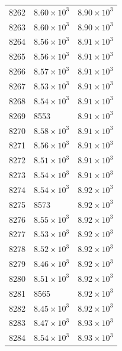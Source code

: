 \begin{table}[H]
\begin{tabular}{lll}
8262 & $\displaystyle 8.60 \times 10^{3}$ & $\displaystyle 8.90 \times 10^{3}$ \\
8263 & $\displaystyle 8.60 \times 10^{3}$ & $\displaystyle 8.90 \times 10^{3}$ \\
8264 & $\displaystyle 8.56 \times 10^{3}$ & $\displaystyle 8.91 \times 10^{3}$ \\
8265 & $\displaystyle 8.56 \times 10^{3}$ & $\displaystyle 8.91 \times 10^{3}$ \\
8266 & $\displaystyle 8.57 \times 10^{3}$ & $\displaystyle 8.91 \times 10^{3}$ \\
8267 & $\displaystyle 8.53 \times 10^{3}$ & $\displaystyle 8.91 \times 10^{3}$ \\
8268 & $\displaystyle 8.54 \times 10^{3}$ & $\displaystyle 8.91 \times 10^{3}$ \\
8269 & 8553 & $\displaystyle 8.91 \times 10^{3}$ \\
8270 & $\displaystyle 8.58 \times 10^{3}$ & $\displaystyle 8.91 \times 10^{3}$ \\
8271 & $\displaystyle 8.56 \times 10^{3}$ & $\displaystyle 8.91 \times 10^{3}$ \\
8272 & $\displaystyle 8.51 \times 10^{3}$ & $\displaystyle 8.91 \times 10^{3}$ \\
8273 & $\displaystyle 8.54 \times 10^{3}$ & $\displaystyle 8.91 \times 10^{3}$ \\
8274 & $\displaystyle 8.54 \times 10^{3}$ & $\displaystyle 8.92 \times 10^{3}$ \\
8275 & 8573 & $\displaystyle 8.92 \times 10^{3}$ \\
8276 & $\displaystyle 8.55 \times 10^{3}$ & $\displaystyle 8.92 \times 10^{3}$ \\
8277 & $\displaystyle 8.53 \times 10^{3}$ & $\displaystyle 8.92 \times 10^{3}$ \\
8278 & $\displaystyle 8.52 \times 10^{3}$ & $\displaystyle 8.92 \times 10^{3}$ \\
8279 & $\displaystyle 8.46 \times 10^{3}$ & $\displaystyle 8.92 \times 10^{3}$ \\
8280 & $\displaystyle 8.51 \times 10^{3}$ & $\displaystyle 8.92 \times 10^{3}$ \\
8281 & 8565 & $\displaystyle 8.92 \times 10^{3}$ \\
8282 & $\displaystyle 8.45 \times 10^{3}$ & $\displaystyle 8.92 \times 10^{3}$ \\
8283 & $\displaystyle 8.47 \times 10^{3}$ & $\displaystyle 8.93 \times 10^{3}$ \\
8284 & $\displaystyle 8.54 \times 10^{3}$ & $\displaystyle 8.93 \times 10^{3}$ \\

\end{tabular}
\end{table}
